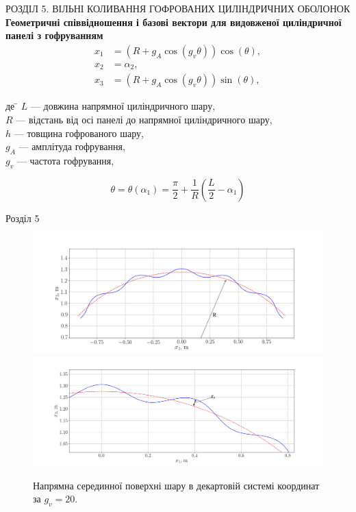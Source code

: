 \documentclass[8pt]{beamer}
\numberwithin{figure}{section}
\numberwithin{equation}{section}
\numberwithin{table}{section}
\begin{document}
\begin{frame}{РОЗДІЛ 5. ВІЛЬНІ КОЛИВАННЯ ГОФРОВАНИХ ЦИЛІНДРИЧНИХ ОБОЛОНОК}
\textbf{Геометричні співвідношення і базові вектори для видовженої циліндричної панелі з гофруванням}
\\
\vspace{1em}
\begin{equation}
\begin{aligned}
x_1&=\left(R + g_{A}\cos\left(g_v\theta\right) \right)\cos\left(\theta\right), \\
x_2&=\alpha_2,\\
x_3&=\left(R + g_{A}\cos\left(g_v\theta\right) \right)\sin\left(\theta\right), 
\end{aligned}
\end{equation}

\begin{tabbing}
де \= $L$ --- довжина напрямної циліндричного шару,\\
\> $R$ --- відстань від осі панелі до напрямної циліндричного шару,\\
\> $h$ --- товщина гофрованого шару,\\
\> $g_A$ --- амплітуда гофрування,\\
\> $g_v$ --- частота гофрування,\\
\end{tabbing}
\[
\theta=\theta\left(\alpha_1\right)=\frac{\pi}{2}+\frac{1}{R}\left(\frac{L}{2}-\alpha_1\right)\]


\end{frame}

\begin{frame}{Розділ 5}

\begin{figure}
	\includegraphics[width=0.8\linewidth]{pic/cor_geomR.png}\\
	\includegraphics[width=0.8\linewidth]{pic/cor_geom_zoomedR.png}
		\caption{Напрямна серединної поверхні шару в декартовій системі координат за $g_v=20$.}
		\label{fig:omage_K_h}
\end{figure}



\end{frame}
\end{document}
